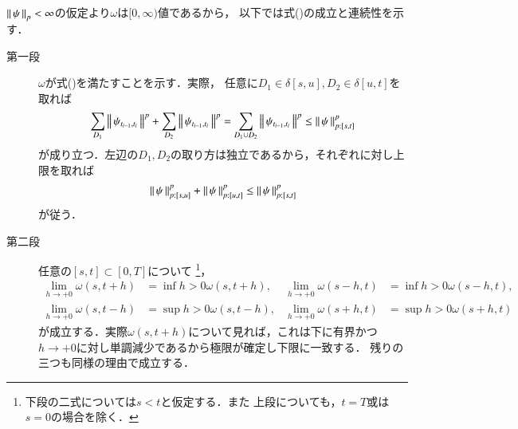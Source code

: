 	\begin{prf}
		$\left\|\, \psi\, \right\|_{p} < \infty$の仮定より$\omega$は$[0,\infty)$値であるから，
		以下では式()の成立と連続性を示す．
		\begin{description}
			\item[第一段]
				$\omega$が式()を満たすことを示す．実際，
				任意に$D_1 \in \delta[s,u],D_2 \in \delta[u,t]$を取れば
				\begin{align}
					\sum_{D_1}\left\|\, \psi_{t_{i-1},t_i}\, \right\|_{}^p
					+ \sum_{D_2}\left\|\, \psi_{t_{i-1},t_i}\, \right\|_{}^p
					= \sum_{D_1 \cup D_2}\left\|\, \psi_{t_{i-1},t_i}\, \right\|_{}^p
					\leq \left\|\, \psi\, \right\|_{p:[s,t]}^p
				\end{align}
				が成り立つ．左辺の$D_1,D_2$の取り方は独立であるから，それぞれに対し上限を取れば
				\begin{align}
					\left\|\, \psi\, \right\|_{p:[s,u]}^p + \left\|\, \psi\, \right\|_{p:[u,t]}^p
					\leq \left\|\, \psi\, \right\|_{p:[s,t]}^p
				\end{align}
				が従う．
			\item[第二段]
				任意の$[s,t] \subset [0,T]$について
				\footnote{
					下段の二式については$s < t$と仮定する．また
					上段についても，$t=T$或は$s=0$の場合を除く．
				}，
				\begin{align}
					\lim_{h \to +0} \omega(s,t+h) &= \inf{h>0}{\omega(s,t+h)},
					&\lim_{h \to +0} \omega(s-h,t) &= \inf{h>0}{\omega(s-h,t)}, \\
					\lim_{h \to +0} \omega(s,t-h) &= \sup{h>0}{\omega(s,t-h)},
					&\lim_{h \to +0} \omega(s+h,t) &= \sup{h>0}{\omega(s+h,t)}
				\end{align}
				が成立する．実際$\omega(s,t+h)$について見れば，これは下に有界かつ
				$h \to +0$に対し単調減少であるから極限が確定し下限に一致する．
				残りの三つも同様の理由で成立する．
				

\end{description}
\end{prf}
